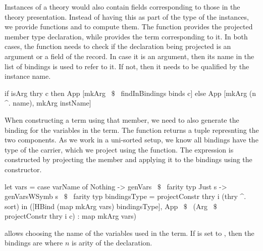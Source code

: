Instances of a theory would also contain fields corresponding to those in the theory presentation. Instead of having this as part of the type of the instances, we provide functions  and  to compute them. 
The function  provides the projected member type declaration, while  provides the term corresponding to it. 
In both cases, the function needs to check if the declaration being projected is an argument or a field of the record. In case it is an argument, then its name in the list of bindings is used to refer to it. If not, then it needs to be qualified by the instance name. 
\begin{hscode} 
 if isArg thry c then App [mkArg ~$\$$~ findInBindings binds c]
 else App [mkArg (n ^. name), mkArg instName]
\end{hscode} 
When constructing a term using that member, we need to also generate the binding for the variables in the term. The function  returns a tuple  represnting the two components. As we work in a uni-sorted setup, we know all bindings have the type of the carrier, which we project using the  function. The expression is constructed by projecting the member and applying it to the bindings using the  constructor. 
\begin{hscode} 
let vars = case varName of
       Nothing -> genVars ~$\$$~ farity typ
       Just s -> genVarsWSymb s ~$\$$~ farity typ
     bindingsType = projectConstr thry i (thry ^. sort) 
in  ([HBind (map mkArg vars) bindingsType],
      App ~$\$$~ (Arg ~$\$$~ projectConstr thry i c) : map mkArg vars) 
\end{hscode} 
 allows choosing the name of the variables used in the term. If  is set to , then the bindings are  where $n$ is arity of the declaration. 


